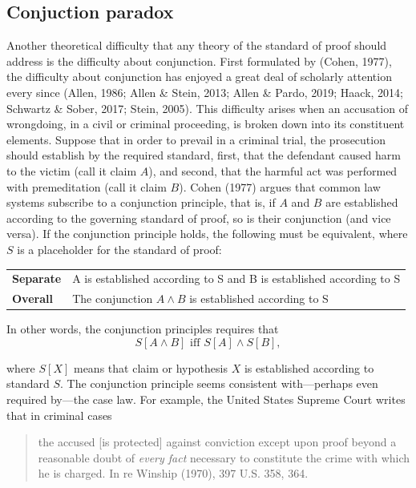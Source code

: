 \documentclass[10pt,dvipsnames,enabledeprecatedfontcommands]{scrartcl}
\newcommand{\et}{\wedge}
\begin{document}
\hypertarget{conjuction-paradox}{%
\subsection{Conjuction paradox}\label{conjuction-paradox}}

Another theoretical difficulty that any theory of the standard of proof
should address is the difficulty about conjunction. First formulated by
(Cohen, 1977), the difficulty about conjunction has enjoyed a great deal
of scholarly attention every since (Allen, 1986; Allen \& Stein, 2013;
Allen \& Pardo, 2019; Haack, 2014; Schwartz \& Sober, 2017; Stein,
2005). This difficulty arises when an accusation of wrongdoing, in a
civil or criminal proceeding, is broken down into its constituent
elements. Suppose that in order to prevail in a criminal trial, the
prosecution should establish by the required standard, first, that the
defendant caused harm to the victim (call it claim \(A\)), and second,
that the harmful act was performed with premeditation (call it claim
\(B\)). Cohen (1977) argues that common law systems subscribe to a
conjunction principle, that is, if \(A\) and \(B\) are established
according to the governing standard of proof, so is their conjunction
(and vice versa). If the conjunction principle holds, the following must
be equivalent, where \(S\) is a placeholder for the standard of proof:

\begin{center}
\begin{tabular}
{@{}ll@{}}
\toprule
\textbf{Separate} &   A is established according to S and B is established according to S\\   
\textbf{Overall}  &   The conjunction $A \et B$ is established according to S  \\ 
\bottomrule
\end{tabular}
\end{center}

\noindent In other words, the conjunction principles requires that
\[S[A \wedge B] \text{ iff } S[A] \wedge S[B],\]

\noindent where \(S[X]\) means that claim or hypothesis \(X\) is
established according to standard \(S\). The conjunction principle seems
consistent with---perhaps even required by---the case law. For example,
the United States Supreme Court writes that in criminal cases

\begin{quote}
the accused [is protected] against conviction except upon proof beyond a reasonable doubt of \textit{every fact} necessary to constitute the crime with which he is charged. In re Winship (1970), 397 U.S. 358, 364. 
\end{quote}
\end{document}
